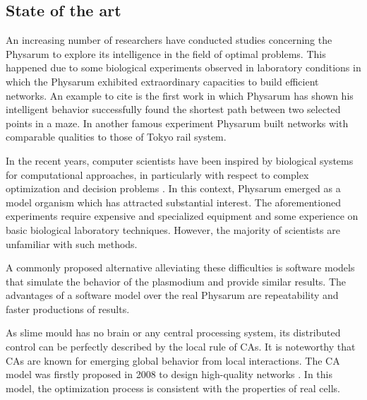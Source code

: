 \subsection{State of the art}
An increasing number of researchers have conducted studies concerning the Physarum to explore its intelligence in the field of optimal problems. This happened due to some biological experiments observed in laboratory conditions in which the Physarum exhibited extraordinary capacities to build efficient networks.
An example to cite is the first work \cite{nakagaki2000intelligence} in which Physarum has shown his intelligent behavior successfully found the shortest path between two selected points in a maze. In another famous experiment \cite{Tero439} Physarum built networks with comparable qualities to those of Tokyo rail system.
\par
In the recent years, computer scientists have been inspired by biological systems for computational approaches, in particularly with respect to complex optimization and decision problems \cite{grube2016physarum}. In this context, Physarum emerged as a model organism which has attracted substantial interest. The aforementioned experiments require expensive and specialized equipment and some experience on basic biological laboratory techniques. However, the majority of scientists are unfamiliar with such methods. 
\par
A commonly proposed alternative alleviating these difficulties is software models that simulate the behavior of the plasmodium and provide similar results. The advantages of a software model over the real Physarum are repeatability and faster productions of results.
\par
As slime mould has no brain or any central processing system, its distributed control can be perfectly described by the local rule of CAs. It is noteworthy that CAs are known for emerging global behavior from local interactions. The CA model was firstly proposed in 2008 to design high-quality networks \cite{gunji2008minimal}. In this model, the optimization process is consistent with the properties of real cells. 